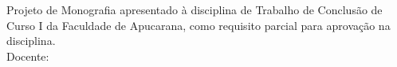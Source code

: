 
\begin{titlepage}
\label{tcc:rosto}
  \begin{center}
    \Large{\AUTOR}\\[10cm]
    \Large{\textbf{\TITULO}}\\[2cm]
    \hspace{.45\textwidth} %
    \begin{minipage}{.5\textwidth}
      \begin{normalsize}
        Projeto de Monografia apresentado \`a disciplina de Trabalho de Conclusão de Curso I da Faculdade de Apucarana, como requisito parcial para aprovação na disciplina.\\[1.5cm]
        Docente: \Orientador
      \end{normalsize}
    \end{minipage}
    \vfill

    \begin{normalsize}
      \Local\\
      \Data
    \end{normalsize}
  \end{center}
\end{titlepage}
